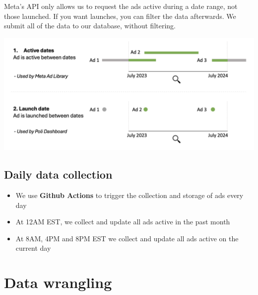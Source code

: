 \documentclass[
  letterpaper,
  DIV=11,
  numbers=noendperiod]{scrreprt}
\begin{document}
\begin{tcolorbox}[enhanced jigsaw, breakable, colback=white, opacityback=0, bottomrule=.15mm, coltitle=black, bottomtitle=1mm, rightrule=.15mm, titlerule=0mm, colframe=quarto-callout-tip-color-frame, left=2mm, colbacktitle=quarto-callout-tip-color!10!white, opacitybacktitle=0.6, toptitle=1mm, title=\textcolor{quarto-callout-tip-color}{\faLightbulb}\hspace{0.5em}{Key distinction}, arc=.35mm, leftrule=.75mm, toprule=.15mm]

Meta's API only allows us to request the ads active during a date range,
not those launched. If you want launches, you can filter the data
afterwards. We submit all of the data to our database, without
filtering.

\end{tcolorbox}

\includegraphics{img/active-launched.png}

\section{Daily data collection}\label{daily-data-collection}

\begin{itemize}
\item
  We use \textbf{Github Actions} to trigger the collection and storage
  of ads every day
\item
  At 12AM EST, we collect and update all ads active in the past month
\item
  At 8AM, 4PM and 8PM EST we collect and update all ads active on the
  current day
\end{itemize}


\chapter{Data wrangling}\label{sec-wrangling}
\end{document}
